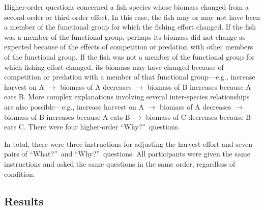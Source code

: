 Higher-order questions concerned a fish species whose biomass changed from a second-order or third-order effect.  In this case, the fish may or may not have been a member of the functional group for which the fishing effort changed.  If the fish was a member of the functional group, perhaps its biomass did not change as expected because of the effects of competition or predation with other members of the functional group.  If the fish was not a member of the functional group for which fishing effort changed, its biomass may have changed because of competition or predation with a member of that functional group---e.g., increase harvest on A $\rightarrow$ biomass of A decreases $\rightarrow$ biomass of B increases because A eats B.  More complex explanations involving several inter-species relationships are also possible---e.g., increase harvest on A $\rightarrow$ biomass of A decreases $\rightarrow$ biomass of B increases because A eats B $\rightarrow$ biomass of C decreases because B eats C.  There were four higher-order ``Why?''\ questions. 

In total, there were three instructions for adjusting the harvest effort and seven pairs of ``What?''\ and ``Why?''\ questions.  All participants were given the same instructions and asked the same questions in the same order, regardless of condition.

\subsection{Results}

